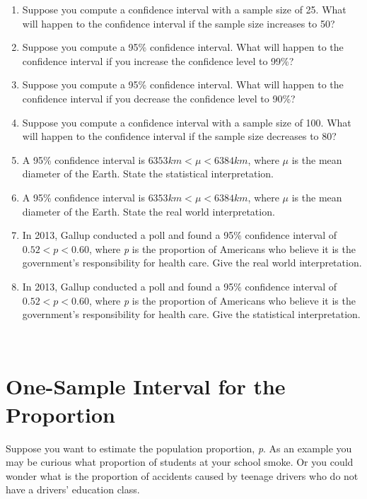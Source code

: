 \documentclass[
]{book}
\begin{document}
\begin{enumerate}
\def\labelenumi{\arabic{enumi}.}
\item
  Suppose you compute a confidence interval with a sample size of 25. What will happen to the confidence interval if the sample size increases to 50?
\item
  Suppose you compute a 95\% confidence interval. What will happen to the confidence interval if you increase the confidence level to 99\%?
\item
  Suppose you compute a 95\% confidence interval. What will happen to the confidence interval if you decrease the confidence level to 90\%?
\item
  Suppose you compute a confidence interval with a sample size of 100. What will happen to the confidence interval if the sample size decreases to 80?
\item
  A 95\% confidence interval is \(6353km< \mu<6384km\), where \(\mu\) is the mean diameter of the Earth. State the statistical interpretation.
\item
  A 95\% confidence interval is \(6353 km < \mu < 6384 km\), where \(\mu\) is the mean diameter of the Earth. State the real world interpretation.
\item
  In 2013, Gallup conducted a poll and found a 95\% confidence interval of \(0.52 < p < 0.60\), where \emph{p} is the proportion of Americans who believe it is the government's responsibility for health care. Give the real world interpretation.
\item
  In 2013, Gallup conducted a poll and found a 95\% confidence interval of \(0.52 < p < 0.60\), where \emph{p} is the proportion of Americans who believe it is the government's responsibility for health care. Give the statistical interpretation.
\end{enumerate}

\textbf{~
}

\hypertarget{one-sample-interval-for-the-proportion}{%
\section{One-Sample Interval for the Proportion}\label{one-sample-interval-for-the-proportion}}

Suppose you want to estimate the population proportion, \emph{p}. As an example you may be curious what proportion of students at your school smoke. Or you could wonder what is the proportion of accidents caused by teenage drivers who do not have a drivers' education class.
\end{document}
